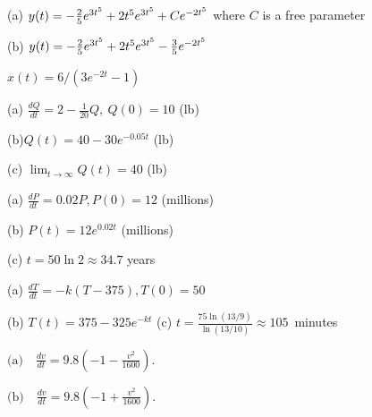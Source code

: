 

\item 
(a) $y(t)= -{2\over 5}e^{3t^5} +2t^5 e^{3t^5} +Ce^{-2t^5}$ where $C$ is a free parameter

(b) $y(t)= -{2\over 5}e^{3t^5} +2t^5 e^{3t^5} -{3\over 5}e^{-2t^5}$

\item
$\displaystyle x(t)=6/(3e^{-2t} -1)$

\item
(a) $\displaystyle \frac{dQ}{dt}=2-\frac{1}{20}Q,\ Q(0)=10$ (lb) 

(b)$Q(t)=40-30e^{-0.05 t}$ (lb) 

(c) $\displaystyle \lim_{t\to\infty} Q(t)=40$ (lb)


\item 
(a)
$\displaystyle \frac{dP}{dt}=0.02P, P(0)=12$ (millions)

(b)
$P(t)=12e^{0.02t}$ (millions)

(c)
$t=50\ln 2\approx 34.7$ years
 

\item
(a)
$\displaystyle \frac{dT}{dt}=-k(T-375), T(0)=50$


(b)
$T(t)=375-325e^{-kt}$
\hfill
(c)
$\displaystyle t=\frac{75\ln(13/9)}{\ln(13/10)}\approx 105$~minutes
 




\item
$\displaystyle
\mbox{(a)}\quad 
\frac{dv}{dt}=9.8\left( -1-\frac{v^2}{1600}\right).
$


$\displaystyle
\mbox{(b)}\quad 
\frac{dv}{dt}=9.8\left( -1+\frac{v^2}{1600}\right).
$

